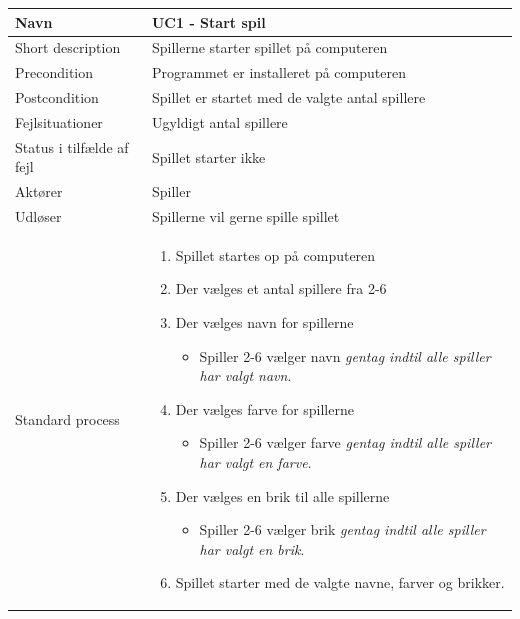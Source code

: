 \begin{center}
\begin{longtable}{|l|p{11cm}|}
\hline
Navn &  UC1 - Start spil\\
\hline
Short description & Spillerne starter spillet på computeren \\
\hline
Precondition & Programmet er installeret på computeren \\
\hline
Postcondition & Spillet er startet med de valgte antal spillere \\
\hline
Fejlsituationer & Ugyldigt antal spillere \\
\hline
Status i tilfælde af fejl & Spillet starter ikke \\
\hline
Aktører & Spiller \\
\hline
Udløser & Spillerne vil gerne spille spillet \\
\hline
Standard process &  
\begin{minipage}[t]{1\textwidth}
  \begin{enumerate}
      \item Spillet startes op på computeren
      \item Der vælges et antal spillere fra 2-6
      \item Der vælges navn for spillerne
      \begin{itemize}
          \item Spiller 2-6 vælger navn 
          \newline
          \emph{gentag indtil alle spiller har valgt navn}.
      \end{itemize}
      \item Der vælges farve for spillerne
      \begin{itemize}
          \item Spiller 2-6 vælger farve 
          \newline
          \emph{gentag indtil alle spiller har valgt en farve}.
      \end{itemize}
      \item Der vælges en brik til alle spillerne
      \begin{itemize}
          \item Spiller 2-6 vælger brik 
          \newline
          \emph{gentag indtil alle spiller har valgt en brik}.
      \end{itemize}
      \item Spillet starter med de valgte navne, farver og brikker.\vspace{0.5cm}

\end{enumerate}
\end{minipage}
\end{longtable}
\end{center}
